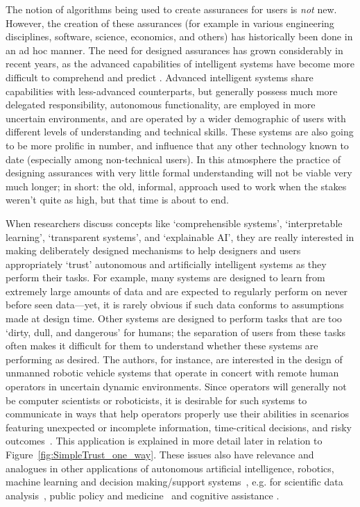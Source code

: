 The notion of algorithms being used to create assurances for users is \emph{not} new. However, the creation of these assurances (for example in various engineering disciplines, software, science, economics, and others) has historically been done in an ad hoc manner. The need for designed assurances has grown considerably in recent years, as the advanced capabilities of intelligent systems have become more difficult to comprehend and predict \cite{Doshi-Velez2017-xy, Weller2017-zx, Lipton2016-ug, Gunning2017-ih}. Advanced intelligent systems share capabilities with less-advanced counterparts, but generally possess much more delegated responsibility, autonomous functionality, are employed in more uncertain environments, and are operated by a wider demographic of users with different levels of understanding and technical skills. These systems are also going to be more prolific in number, and influence that any other technology known to date (especially among non-technical users). In this atmosphere the practice of designing assurances with very little formal understanding will not be viable very much longer; in short: the old, informal, approach used to work when the stakes weren't quite as high, but that time is about to end.

When researchers discuss concepts like `comprehensible systems', `interpretable learning', `transparent systems', and `explainable AI', they are really interested in making deliberately designed mechanisms to help designers and users appropriately `trust' autonomous and artificially intelligent systems as they perform their tasks. 
For example, many systems are designed to learn from extremely large amounts of data and are expected to regularly perform on never before seen data---yet, it is rarely obvious if such data conforms to assumptions made at design time. 
Other systems are designed to perform tasks that are too `dirty, dull, and dangerous' for humans; the separation of users from these tasks often makes it difficult for them to understand whether these systems are performing as desired. 
The authors, for instance, are interested in the design of unmanned robotic vehicle systems that operate in concert with remote human operators in uncertain dynamic environments. 
Since operators will generally not be computer scientists or roboticists, it is desirable for such systems to communicate in ways that help operators properly use their abilities in scenarios featuring unexpected or incomplete information, time-critical decisions, and risky outcomes~\cite{Hutchins2015-if, Sweet2016-tz}. 
This application is explained in more detail later in relation to Figure~\ref{fig:SimpleTrust_one_way}. 
These issues also have relevance and analogues in other applications of autonomous artificial intelligence, robotics, machine learning and decision making/support systems~\cite{Garcia2015-rs,Otte2013-oo,Sugiyama2013-ci,Amodei2016-xi}, e.g. for scientific data analysis~\cite{Faghmous2014-og}, public policy and medicine~\cite{Wagner2016-ck,Jovanovic2016-gw} and cognitive assistance \cite{Gutfreund2016-xe}.

